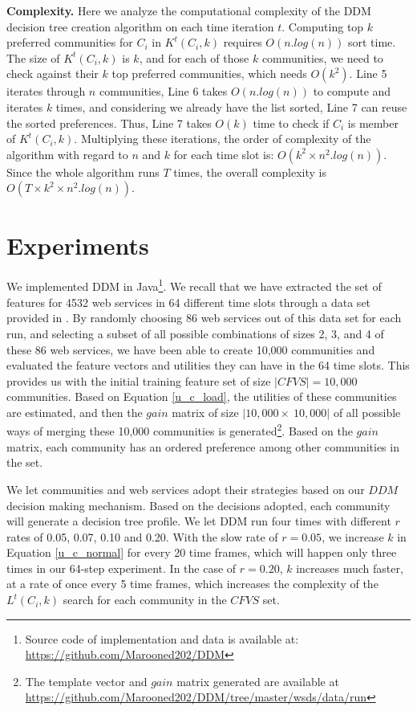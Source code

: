 \documentclass[11pt,onecolumn]{IEEEtran}
\begin{document}
\textbf{Complexity.} Here we analyze the computational complexity of the DDM decision tree creation algorithm on each time iteration $t$. Computing top $k$ preferred communities for $C_i$ in $K^t(C_i, k)$ requires $O(n.log(n))$ sort time. The size of $K^t(C_i, k)$ is $k$, and for each of those $k$ communities, we need to check against their $k$ top preferred communities, which needs $O(k^2)$. Line 5 iterates through $n$ communities, Line 6 takes $O(n.log(n))$ to compute and iterates $k$ times, and considering we already have the list sorted, Line 7 can reuse the sorted preferences. Thus, Line 7 takes $O(k)$ time to check if $C_i$ is member of $K^t(C_i, k)$. Multiplying these iterations, the order of complexity of the algorithm with regard to $n$ and $k$ for each time slot is: $O(k^2 \times n^2.log(n))$. Since the whole algorithm runs $T$ times, the overall complexity is $O(T \times k^2 \times n^2.log(n))$.



\section{Experiments}\label{s:experiments}
We implemented DDM in Java\footnote{Source code of implementation and data is available at: \url{https://github.com/Marooned202/DDM}}. We recall that we have extracted the set of features for 4532 web services in 64 different time slots through a data set provided in \cite{10.1109/ISSRE.2011.17}. By randomly choosing 86 web services out of this data set for each run, and selecting a subset of all possible combinations of sizes 2, 3, and 4 of these 86 web services, we have been able to create 10,000 communities and evaluated the feature vectors and utilities they can have in the 64 time slots. This provides us with the initial training feature set of size $|CFVS| = 10,000$ communities. Based on Equation \ref{u_c_load}, the utilities of these communities are estimated, and then the $gain$ matrix of size $|10,000 \times~ 10,000|$ of all possible ways of merging these 10,000 communities is generated\footnote {The template vector and $gain$ matrix generated are available at \url{https://github.com/Marooned202/DDM/tree/master/wsds/data/run}}. Based on the $gain$ matrix, each community has an ordered preference among other communities in the set. 

We let communities and web services adopt their strategies based on our $DDM$ decision making mechanism. Based on the decisions adopted, each community will generate a decision tree profile. We let DDM run four times with different $r$ rates of 0.05, 0.07, 0.10 and 0.20. With the slow rate of $r = 0.05$, we increase $k$ in Equation \ref{u_c_normal} for every 20 time frames, which will happen only three times in our 64-step experiment. In the case of $r = 0.20$, $k$ increases much faster, at a rate of once every 5 time frames, which increases the complexity of the $L^t(C_i,k)$ search for each community in the $CFVS$ set. 
\end{document}
